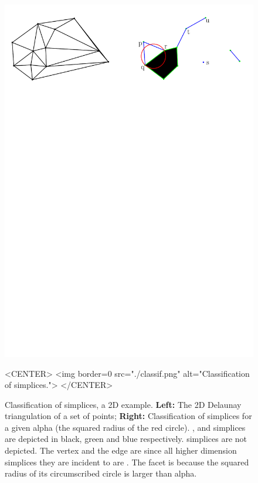 \begin{figure}
\begin{ccTexOnly}
\begin{center}
\includegraphics[width=15cm]{Alpha_shapes_3/classif}
\end{center}
\end{ccTexOnly}
\begin{ccHtmlOnly}
<CENTER>
<img border=0 src="./classif.png" alt="Classification of simplices.">
</CENTER>
\end{ccHtmlOnly}

\caption{Classification of simplices, a 2D example.
\textbf{Left:} The 2D Delaunay triangulation of a set of points;
\textbf{Right:} Classification of simplices for a given alpha (the squared radius of the red circle).
,  and  simplices are depicted in black, green and blue
respectively.  simplices are not depicted. The vertex  and the edge  are 
since all higher dimension simplices they are incident to are .
The facet  is  because the squared radius of its circumscribed circle is larger
than alpha.
\label{fig-classif}}
\end{figure}


